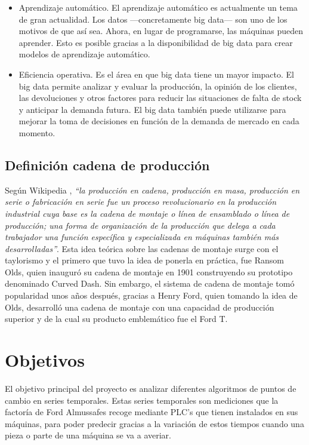\documentclass[runningheads,a4paper,12pt]{report}
\begin{document}
\begin{itemize}
	\item Aprendizaje automático. El aprendizaje automático es actualmente un tema de gran actualidad. Los datos —concretamente big data— son uno de los motivos de que así sea. Ahora, en lugar de programarse, las máquinas pueden aprender. Esto es posible gracias a la disponibilidad de big data para crear modelos de aprendizaje automático. \\
	\item Eficiencia operativa. Es el área en que big data tiene un mayor impacto. El big data permite analizar y evaluar la producción, la opinión de los clientes, las devoluciones y otros factores para reducir las situaciones de falta de stock y anticipar la demanda futura. El big data también puede utilizarse para mejorar la toma de decisiones en función de la demanda de mercado en cada momento.\\	
\end{itemize}

\subsection{Definición cadena de producción}
Según Wikipedia \cite{wiki}, \textit{“la producción en cadena, producción en masa, producción en serie o fabricación en serie fue un proceso revolucionario en la producción industrial cuya base es la cadena de montaje o línea de ensamblado o línea de producción; una forma de organización de la producción que delega a cada trabajador una función específica y especializada en máquinas también más desarrolladas”}. Esta idea teórica sobre las cadenas de montaje surge con el taylorismo y el primero que tuvo la idea de ponerla en práctica, fue Ransom Olds, quien inauguró su cadena de montaje en 1901 construyendo su prototipo denominado Curved Dash. Sin embargo, el sistema de cadena de montaje tomó popularidad unos años después, gracias a Henry Ford, quien tomando la idea de Olds, desarrolló una cadena de montaje con una capacidad de producción superior y de la cual su producto emblemático fue el Ford T.\\



\cleardoublepage

\section{Objetivos}
El objetivo principal del proyecto es analizar diferentes algoritmos de puntos de cambio en series temporales. Estas series temporales son mediciones que la factoría de Ford Almussafes recoge mediante PLC's que tienen instalados en sus máquinas, para poder predecir gracias a la variación de estos tiempos cuando una pieza o parte de una máquina se va a averiar.\\
\end{document}

